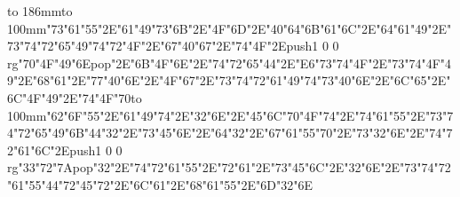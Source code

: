 \hbox to 186mm{\hsize=81mm\vbox to 100mm{\vfill\ipa\char"73\ipa\char"61\ipa\char"55\ipa\char"2E\ipa\char"61\ipa\char"49\ipa\char"73\ipa\char"6B\ipa\char"2E\ipa\char"4F\ipa\char"6D\ipa\char"2E\ipa\char"40\ipa\char"64\medskip\ipa\char"6B\ipa\char"61\ipa\char"6C\ipa\char"2E\ipa\char"64\ipa\char"61\ipa\char"49\ipa\char"2E\ipa\char"73\ipa\char"74\ipa\char"72\ipa\char"65\ipa\char"49\ipa\char"74\medskip\ipa\char"72\ipa\char"4F\ipa\char"2E\ipa\char"67\ipa\char"40\ipa\char"67\ipa\char"2E\ipa\char"74\ipa\char"4F\ipa\char"2E\pdfcolorstack\match push{1 0 0 rg}\ipa\char"70\ipa\char"4F\ipa\char"49\ipa\char"6E\pdfcolorstack\match pop{}\ipa\char"2E\ipa\char"6B\ipa\char"4F\ipa\char"6E\ipa\char"2E\ipa\char"74\ipa\char"72\ipa\char"65\ipa\char"44\ipa\char"2E\ipa\char"E6\ipa\char"73\ipa\char"74\medskip\ipa\char"4F\ipa\char"2E\ipa\char"73\ipa\char"74\ipa\char"4F\ipa\char"49\ipa\char"2E\ipa\char"68\ipa\char"61\ipa\char"2E\ipa\char"77\ipa\char"40\ipa\char"6E\ipa\char"2E\ipa\char"4F\ipa\char"67\ipa\char"2E\ipa\char"73\ipa\char"74\ipa\char"72\ipa\char"61\ipa\char"49\ipa\char"74\medskip\ipa\char"73\ipa\char"40\ipa\char"6E\ipa\char"2E\ipa\char"6C\ipa\char"65\ipa\char"2E\ipa\char"6C\ipa\char"4F\ipa\char"49\ipa\char"2E\ipa\char"74\ipa\char"4F\ipa\char"70\vfill}\hfill\vbox to 100mm{\vfill\ipa\char"62\ipa\char"6F\ipa\char"55\ipa\char"2E\ipa\char"61\ipa\char"49\ipa\char"74\ipa\char"2E\ipa\char"32\ipa\char"6E\ipa\char"2E\ipa\char"45\ipa\char"6C\medskip\ipa\char"70\ipa\char"4F\ipa\char"74\ipa\char"2E\ipa\char"74\ipa\char"61\ipa\char"55\ipa\char"2E\ipa\char"73\ipa\char"74\ipa\char"72\ipa\char"65\ipa\char"49\ipa\char"6B\medskip\ipa\char"44\ipa\char"32\ipa\char"2E\ipa\char"73\ipa\char"45\ipa\char"6E\ipa\char"2E\ipa\char"64\ipa\char"32\ipa\char"2E\ipa\char"67\ipa\char"61\ipa\char"55\ipa\char"70\ipa\char"2E\ipa\char"73\ipa\char"32\ipa\char"6E\ipa\char"2E\ipa\char"74\ipa\char"72\ipa\char"61\ipa\char"6C\ipa\char"2E\pdfcolorstack\match push{1 0 0 rg}\ipa\char"33\ipa\char"72\ipa\char"7A\pdfcolorstack\match pop{}\medskip\ipa\char"32\ipa\char"2E\ipa\char"74\ipa\char"72\ipa\char"61\ipa\char"55\ipa\char"2E\ipa\char"72\ipa\char"61\ipa\char"2E\ipa\char"73\ipa\char"45\ipa\char"6C\ipa\char"2E\ipa\char"32\ipa\char"6E\ipa\char"2E\ipa\char"73\ipa\char"74\ipa\char"72\ipa\char"61\ipa\char"55\ipa\char"44\medskip\ipa\char"72\ipa\char"45\ipa\char"72\ipa\char"2E\ipa\char"6C\ipa\char"61\ipa\char"2E\ipa\char"68\ipa\char"61\ipa\char"55\ipa\char"2E\ipa\char"6D\ipa\char"32\ipa\char"6E\vfill}}\eject

